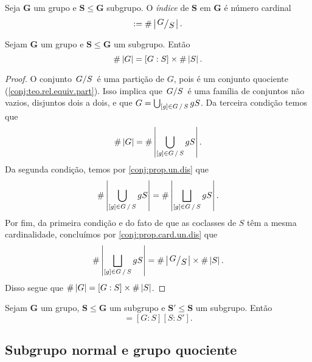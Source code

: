 \begin{definition}
Seja $\bm G$ um grupo e $\bm S \leq \bm G$ subgrupo. O \emph{índice} de $\bm S$ em $\bm G$ é número cardinal
	\begin{equation*}
	[G : S] := \card{\quo{G}{S}}.
	\end{equation*}
\end{definition}

\begin{proposition}
Sejam $\bm G$ um grupo e $\bm S \leq \bm G$ um subgrupo. Então
	\begin{equation*}
	\#\left\lvert{G}\right\rvert=[G:S] \times \#\left\lvert{S}\right\rvert.
	\end{equation*}
\end{proposition}
\begin{proof}
O conjunto $\quo{G}{S}$ é uma partição de $G$, pois é um conjunto quociente (\ref{conj:teo.rel.equiv.part}). Isso implica que $\quo{G}{S}$ é uma família de conjuntos não vazios, disjuntos dois a dois, e que $G = \bigcup_{[g] \in \quo{G}{S}} gS$. Da terceira condição temos que
	\begin{equation*}
	\card{G} = \card{\bigcup_{[g] \in \quo{G}{S}} gS}.
	\end{equation*}
Da segunda condição, temos por \ref{conj:prop.un.dis} que
	\begin{equation*}
	\card{\bigcup_{[g] \in \quo{G}{S}} gS} = \card{\bigsqcup_{[g] \in \quo{G}{S}} gS}.
	\end{equation*}
Por fim, da primeira condição e do fato de que as coclasses de $S$ têm a mesma cardinalidade, concluímos por \ref{conj:prop.card.un.dis} que
	\begin{equation*}
	\card{\bigsqcup_{[g] \in \quo{G}{S}} gS} = \card{\quo{G}{S}} \times \card{S}.
	\end{equation*}
Disso segue que $\#\left\lvert{G}\right\rvert=[G:S] \times \#\left\lvert{S}\right\rvert$.
\end{proof}

\begin{exercise}
Sejam $\bm G$ um grupo, $\bm S \leq \bm G$ um subgrupo e $\bm S' \leq \bm S$ um subgrupo. Então
	\begin{equation*}
	[G : S'] = [G : S][S : S'].
	\end{equation*}
\end{exercise}


\subsection{Subgrupo normal e grupo quociente}

